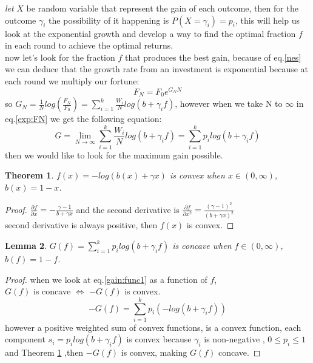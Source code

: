 \documentclass{article}
\newtheorem{thm}{Theorem}[section]
\newtheorem{lem}[thm]{Lemma}
\newcommand{\pdiv}[2]{{\frac{\partial#1}{\partial#2}}}
\begin{document}
	\textit{let} $X$ be random variable that represent the gain of each outcome, then for the outcome $\gamma_i$ the possibility of it happening is $P(X=\gamma_i) = p_i$, this will help us look at the exponential growth and develop a way to find the optimal fraction $f$ in each round to achieve the optimal returns.
	\\
	now let's look for the fraction \(f\) that produces the best gain, because of eq.\ref{nes} we can deduce that the growth rate from an investment is exponential because at each round we multiply our fortune:
	\begin{equation}
		\label{exp:FN}
		F_N = F_0e^{G_{N}N}
	\end{equation}
	so \(G_N = \frac{1}{N}log(\frac{F_N}{F_0}) = \sum_{i=1}^{k} \frac{W_i}{N}log(b + \gamma_i f)\), however when we take N to \(\infty\) in eq.\ref{exp:FN} we get the following equation:
	\begin{equation}
		\label{gain:func1}
		G = \lim_{N \to \infty} \sum_{i=1}^{k} \frac{W_i}{N}log(b+\gamma_i f) = \sum_{i=1}^{k} p_i log(b+\gamma_i f)
	\end{equation}
	then we would like to look for the maximum gain possible.
	\newline \newline
	\begin{thm}\label{thm1}
		$f(x) = -log(b(x)+\gamma x)$ is convex when $x\in (0,\infty)$, $b(x) = 1-x$.
	\end{thm}
	\begin{proof}
		$\pdiv{f}{x} = -\frac{\gamma - 1}{b+\gamma x}$ and the second derivative is 
		$\frac{\partial f}{\partial x^2} = \frac{(\gamma -1) ^2}{(b+\gamma x)^2}$\\
		second derivative is always positive, then $f(x)$ is convex.
		\newline
	\end{proof}	
	\begin{lem}
		\label{lem1}
		\(G(f) = \sum_{i=1}^{k} p_i log(b+\gamma_i f)\) is concave when $f\in (0,\infty)$, $b(f) = 1-f$.
	\end{lem}
	\begin{proof}
		when we look at eq.\ref{gain:func1} as a function of $f$,\\
		$G(f)$ is concave $\iff$ $-G(f)$ is convex.
		\[-G(f) = \sum_{i=1}^{k} p_i (-log(b+\gamma_i f))\]
		however a positive weighted sum of convex functions, is a convex function, each component $s_i = p_i log(b+\gamma_i f)$ is convex because $\gamma _i$ is non-negative , $0\le p_i \le 1$ and Theorem \ref{thm1} ,then \(-G(f)\) is convex, making $G(f)$ concave.
		\newline
	\end{proof}
\end{document}
